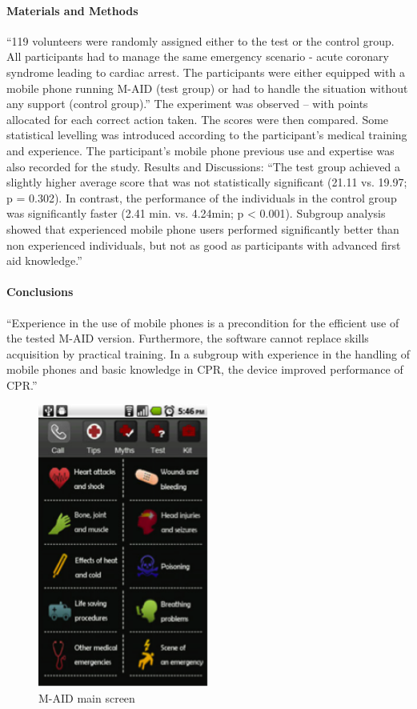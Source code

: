 \paragraph{Materials and Methods} ``119 volunteers were randomly assigned either to the test or the control group. All participants had to manage the same emergency scenario - acute coronary syndrome leading to cardiac arrest. The participants were either equipped with a mobile phone running M-AID (test group) or had to handle the situation without any support (control group).''
The experiment was observed – with points allocated for each correct action taken. The scores were then compared. Some statistical levelling was introduced according to the participant’s medical training and experience. The participant’s mobile phone previous use and expertise was also recorded for the study. 
Results and Discussions: “The test group achieved a slightly higher average score that was not statistically significant (21.11 vs. 19.97; p = 0.302). In contrast, the performance of the individuals in the control group was significantly faster (2.41 min. vs. 4.24min; p < 0.001). Subgroup analysis showed that experienced mobile phone users performed significantly better than non experienced individuals, but not as good as participants with advanced first aid knowledge.”
\paragraph{Conclusions} ``Experience in the use of mobile phones is a precondition for the efficient use of the tested M-AID version. Furthermore, the software cannot replace skills acquisition by practical training. In a subgroup with experience in the handling of mobile phones and basic knowledge in CPR, the device improved performance of CPR.''

\begin{figure}[H]
\centering
\includegraphics[width=0.5\textwidth]{images/m-aid-1}
\caption{M-AID main screen}
\label{fig:m-aid-1}
\end{figure}

